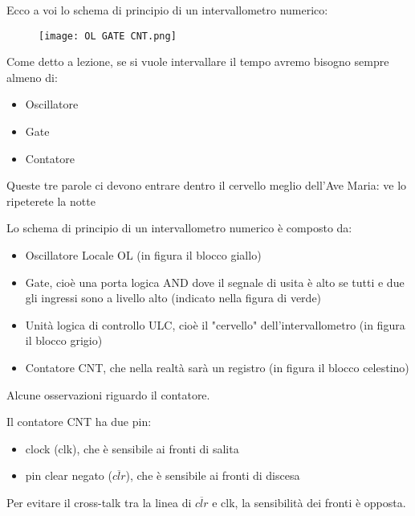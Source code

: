 Ecco a voi lo schema di principio di un intervallometro numerico: 

\begin{figure}[h]
    \centering
    \texttt{[image: OL GATE CNT.png]}
\end{figure}

\begin{tcolorbox}
    Come detto a lezione, se si vuole intervallare il tempo avremo bisogno sempre almeno di: 
    \begin{itemize}
        \item Oscillatore 
        \item Gate 
        \item Contatore
    \end{itemize}

    Queste tre parole ci devono entrare dentro il cervello meglio dell'Ave Maria: ve lo ripeterete la notte
\end{tcolorbox}

Lo schema di principio di un intervallometro numerico è composto da: 

\begin{itemize}
    \item Oscillatore Locale OL (in figura il blocco giallo) 
    \item Gate, cioè una porta logica AND dove il segnale di usita è alto se tutti e due gli ingressi sono a livello alto (indicato nella figura di verde) 
    \item Unità logica di controllo ULC, cioè il "cervello" dell'intervallometro (in figura il blocco grigio) 
    \item Contatore CNT, che nella realtà sarà un registro (in figura il blocco celestino) 
\end{itemize}

Alcune osservazioni riguardo il contatore. \newline 

Il contatore CNT ha due pin: 

\begin{itemize}
    \item clock (clk), che è sensibile ai fronti di salita 
    \item pin clear negato ($\overline{clr}$), che è sensibile ai fronti di discesa  
\end{itemize}

Per evitare il cross-talk tra la linea di $\overline{clr}$ e clk, la sensibilità dei fronti è opposta. \newline 

